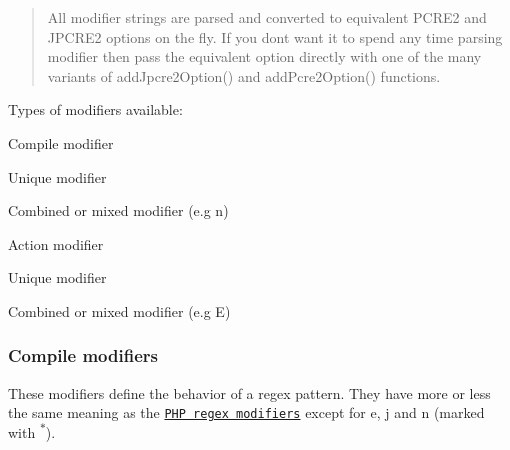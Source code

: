 \begin{quote}
All modifier strings are parsed and converted to equivalent P\+C\+R\+E2 and J\+P\+C\+R\+E2 options on the fly. If you don\textquotesingle{}t want it to spend any time parsing modifier then pass the equivalent option directly with one of the many variants of {\ttfamily add\+Jpcre2\+Option()} and {\ttfamily add\+Pcre2\+Option()} functions. \end{quote}


Types of modifiers available\+:


\begin{DoxyEnumerate}
\item Compile modifier
\begin{DoxyEnumerate}
\item Unique modifier
\item Combined or mixed modifier (e.\+g \textquotesingle{}n\textquotesingle{})
\end{DoxyEnumerate}
\item Action modifier
\begin{DoxyEnumerate}
\item Unique modifier
\item Combined or mixed modifier (e.\+g \textquotesingle{}E\textquotesingle{})
\end{DoxyEnumerate}
\end{DoxyEnumerate}\hypertarget{index_compile-modifier}{}\subsubsection{Compile modifiers}\label{index_compile-modifier}
These modifiers define the behavior of a regex pattern. They have more or less the same meaning as the \href{https://php.net/manual/en/reference.pcre.pattern.modifiers.php}{\tt P\+HP regex modifiers} except for {\ttfamily e, j and n} (marked with \textsuperscript{$\ast$}).

